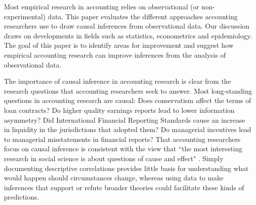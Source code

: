 \documentclass[12pt,reqno,titlepage]{amsart}
\begin{document}
\begin{doublespace} 
Most empirical research in accounting relies on observational (or non-experimental) data.
This paper evaluates the different approaches accounting researchers use to draw causal inferences from observational data. 
Our discussion draws on developments in fields such as statistics, econometrics and epidemiology. 
The goal of this paper is to identify areas for improvement and suggest how empirical accounting research can improve inferences from the analysis of observational data.

The importance of causal inference in accounting research is clear from the research questions that accounting researchers seek to answer. 
Most long-standing questions in accounting research are causal: 
Does conservatism affect the terms of loan contracts?
Do higher quality earnings reports lead to lower information asymmetry? 
Did International Financial Reporting Standards cause an increase in liquidity in the jurisdictions that adopted them?
Do managerial incentives lead to managerial misstatements in financial reports?
That accounting researchers focus on causal inference is consistent with the view that ``the most interesting research in social science is about questions of cause and effect" \cite[p. 3]{Angrist:2008vk}.
Simply documenting descriptive correlations provides little basis for understanding what would happen should circumstances change, 
whereas using data to make inferences that support or refute broader theories could facilitate these kinds of predictions.



\end{doublespace}
\end{document}
